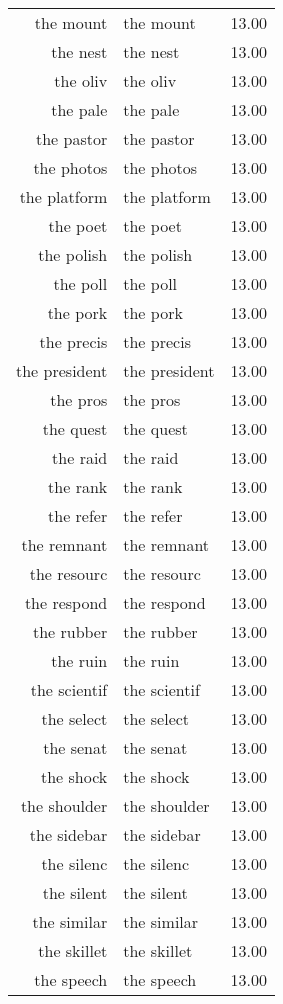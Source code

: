 \begin{table}[ht]
\begin{tabular}{rlr}
  the mount & the mount & 13.00 \\ 
  the nest & the nest & 13.00 \\ 
  the oliv & the oliv & 13.00 \\ 
  the pale & the pale & 13.00 \\ 
  the pastor & the pastor & 13.00 \\ 
  the photos & the photos & 13.00 \\ 
  the platform & the platform & 13.00 \\ 
  the poet & the poet & 13.00 \\ 
  the polish & the polish & 13.00 \\ 
  the poll & the poll & 13.00 \\ 
  the pork & the pork & 13.00 \\ 
  the precis & the precis & 13.00 \\ 
  the president & the president & 13.00 \\ 
  the pros & the pros & 13.00 \\ 
  the quest & the quest & 13.00 \\ 
  the raid & the raid & 13.00 \\ 
  the rank & the rank & 13.00 \\ 
  the refer & the refer & 13.00 \\ 
  the remnant & the remnant & 13.00 \\ 
  the resourc & the resourc & 13.00 \\ 
  the respond & the respond & 13.00 \\ 
  the rubber & the rubber & 13.00 \\ 
  the ruin & the ruin & 13.00 \\ 
  the scientif & the scientif & 13.00 \\ 
  the select & the select & 13.00 \\ 
  the senat & the senat & 13.00 \\ 
  the shock & the shock & 13.00 \\ 
  the shoulder & the shoulder & 13.00 \\ 
  the sidebar & the sidebar & 13.00 \\ 
  the silenc & the silenc & 13.00 \\ 
  the silent & the silent & 13.00 \\ 
  the similar & the similar & 13.00 \\ 
  the skillet & the skillet & 13.00 \\ 
  the speech & the speech & 13.00 \\ 

\end{tabular}
\end{table}
